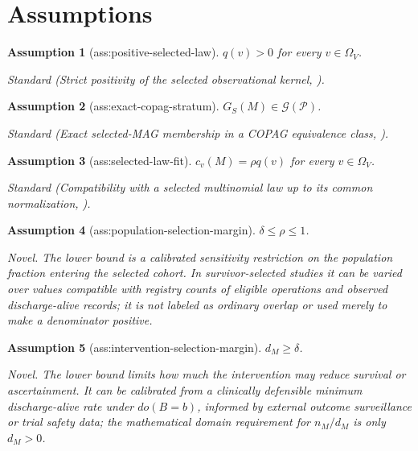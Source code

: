 \documentclass{article}
\newtheorem{assumption}{Assumption}
\begin{document}
\section{Assumptions}

\begin{assumption}[ass:positive-selected-law]\label{ass:positive-selected-law}
\(q(v)>0\) for every \(v\in\Omega_V\).
\par\smallskip\noindent\emph{Standard} (Strict positivity of the selected observational kernel, \cite{ChenMooij2026sIDP}).
\end{assumption}

\begin{assumption}[ass:exact-copag-stratum]\label{ass:exact-copag-stratum}
\(G_S(M)\in\mathcal G(\mathcal P)\).
\par\smallskip\noindent\emph{Standard} (Exact selected-MAG membership in a COPAG equivalence class, \cite{ChenMooij2026sIDP}).
\end{assumption}

\begin{assumption}[ass:selected-law-fit]\label{ass:selected-law-fit}
\(c_v(M)=\rho q(v)\) for every \(v\in\Omega_V\).
\par\smallskip\noindent\emph{Standard} (Compatibility with a selected multinomial law up to its common normalization, \cite{DuarteEtAl2024AutoBounds}).
\end{assumption}

\begin{assumption}[ass:population-selection-margin]\label{ass:population-selection-margin}
\(\delta\le\rho\le1\).
\par\smallskip\noindent\emph{Novel.} The lower bound is a calibrated sensitivity restriction on the population fraction entering the selected cohort. In survivor-selected studies it can be varied over values compatible with registry counts of eligible operations and observed discharge-alive records; it is not labeled as ordinary overlap or used merely to make a denominator positive.
\end{assumption}

\begin{assumption}[ass:intervention-selection-margin]\label{ass:intervention-selection-margin}
\(d_M\ge\delta\).
\par\smallskip\noindent\emph{Novel.} The lower bound limits how much the intervention may reduce survival or ascertainment. It can be calibrated from a clinically defensible minimum discharge-alive rate under \(do(B=b)\), informed by external outcome surveillance or trial safety data; the mathematical domain requirement for \(n_M/d_M\) is only \(d_M>0\).
\end{assumption}
\end{document}
